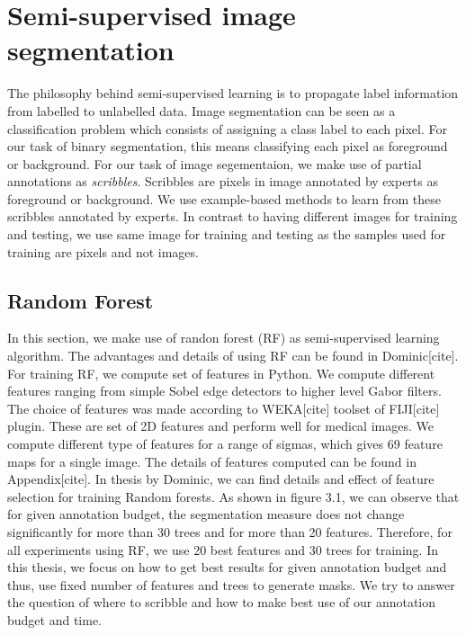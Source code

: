 %
\newpage
\chapter{Semi-supervised image segmentation}
The philosophy behind semi-supervised learning is to propagate label information from labelled to unlabelled data. Image segmentation can be seen as a classification problem which consists of assigning a class label to each pixel. For our task of binary segmentation, this means classifying each pixel as foreground or background. For our task of image segementaion, we make use of partial annotations as \textit{scribbles}. Scribbles are pixels in image annotated by experts as foreground or background. We use example-based methods to learn from these scribbles annotated by experts. In contrast to having different images for training and testing, we use same image for training and testing as the samples used for training are pixels and not images.

\section{Random Forest}
In this section, we make use of randon forest (RF) as semi-supervised learning algorithm. The advantages and details of using RF can be found in Dominic[cite]. For training RF, we compute set of features in Python. We compute different features ranging from simple Sobel edge detectors to higher level Gabor filters. The choice of features was made according to WEKA[cite] toolset of FIJI[cite] plugin. These are set of 2D features and perform well for medical images. We compute different type of features for a range of sigmas, which gives 69 feature maps for a single image. The details of features computed can be found in Appendix[cite]. In thesis by Dominic, we can find details and effect of feature selection for training Random forests. As shown in figure 3.1, we can observe that for given annotation budget, the segmentation measure does not change significantly for more than 30 trees and for more than 20 features. Therefore, for all experiments using RF, we use 20 best features and 30 trees for training. In this thesis, we focus on how to get best results for given annotation budget and thus, use fixed number of features and trees to generate masks.  We try to answer the question of where to scribble and how to make best use of our annotation budget and time.

